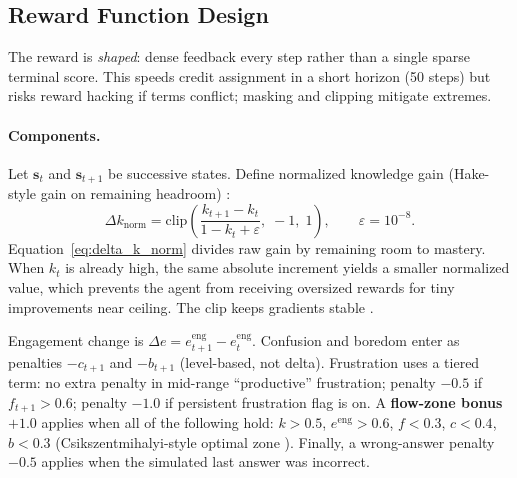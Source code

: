 \subsection{Reward Function Design}\label{sec:method_reward}

The reward is \emph{shaped}: dense feedback every step rather than a single sparse terminal score. This speeds credit assignment in a short horizon (50 steps) but risks reward hacking if terms conflict; masking and clipping mitigate extremes.

\paragraph{Components.}
Let $\mathbf{s}_t$ and $\mathbf{s}_{t+1}$ be successive states. Define normalized knowledge gain (Hake-style gain on remaining headroom) \cite{hake_normalized_gain_1998}:
\begin{equation}
    \Delta k_{\mathrm{norm}} = \mathrm{clip}\!\left(
        \frac{k_{t+1} - k_t}{1 - k_t + \varepsilon},\; -1,\; 1
    \right), \qquad \varepsilon = 10^{-8}.
    \label{eq:delta_k_norm}
\end{equation}
Equation~\eqref{eq:delta_k_norm} divides raw gain by remaining room to mastery. When $k_t$ is already high, the same absolute increment yields a smaller normalized value, which prevents the agent from receiving oversized rewards for tiny improvements near ceiling. The clip keeps gradients stable \cite{mnih_dqn_2015}.

Engagement change is $\Delta e = e^{\mathrm{eng}}_{t+1} - e^{\mathrm{eng}}_t$. Confusion and boredom enter as penalties $-c_{t+1}$ and $-b_{t+1}$ (level-based, not delta). Frustration uses a tiered term: no extra penalty in mid-range ``productive'' frustration; penalty $-0.5$ if $f_{t+1} > 0.6$; penalty $-1.0$ if persistent frustration flag is on. A \textbf{flow-zone bonus} $+1.0$ applies when all of the following hold: $k>0.5$, $e^{\mathrm{eng}}>0.6$, $f<0.3$, $c<0.4$, $b<0.3$ (Csikszentmihalyi-style optimal zone \cite{perez_emotions_2024,csikszentmihalyi_flow_1990}). Finally, a wrong-answer penalty $-0.5$ applies when the simulated last answer was incorrect.

